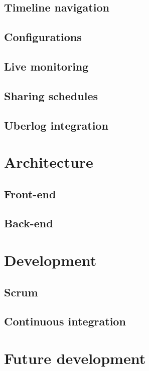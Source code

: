 \subsection{Timeline navigation}
\subsection{Configurations}
\subsection{Live monitoring}
\subsection{Sharing schedules}
\subsection{Uberlog integration}
\section{Architecture}
\subsection{Front-end}
\subsection{Back-end}
\section{Development}
\subsection{Scrum}
\subsection{Continuous integration}
\section{Future development}